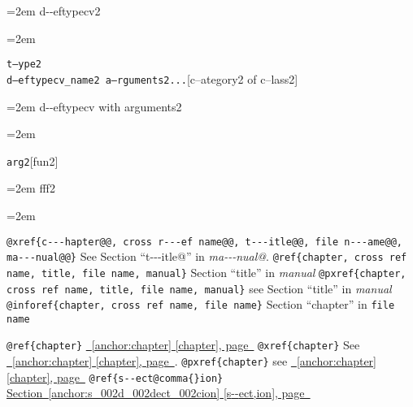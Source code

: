\documentclass{book}
\begin{document}
%
\par\begingroup\obeylines\obeyspaces\frenchspacing\leftskip=2em\relax\parskip=0pt\relax\ttfamily{}%
d{-}{-}eftypecv2
\endgroup{}%
\par\begingroup\obeylines\obeyspaces\frenchspacing\leftskip=2em\relax\parskip=0pt\relax\ttfamily{}%

\endgroup{}%
\noindent\texttt\bgroup{}t--ype2\leavevmode{}\\d--eftypecv\_name2 a--rguments2...\egroup{}\hfill[c--ategory2 of c--lass2]



%
\par\begingroup\obeylines\obeyspaces\frenchspacing\leftskip=2em\relax\parskip=0pt\relax\ttfamily{}%
d{-}{-}eftypecv with arguments2
\endgroup{}%
\par\begingroup\obeylines\obeyspaces\frenchspacing\leftskip=2em\relax\parskip=0pt\relax\ttfamily{}%

\endgroup{}%
\noindent\texttt\bgroup{}arg2\egroup{}\hfill[fun2]



%
\par\begingroup\obeylines\obeyspaces\frenchspacing\leftskip=2em\relax\parskip=0pt\relax\ttfamily{}%
fff2
\endgroup{}%
\par\begingroup\obeylines\obeyspaces\frenchspacing\leftskip=2em\relax\parskip=0pt\relax\ttfamily{}%


\texttt{@xref\{c{-}{-}{-}hapter@@, cross r{-}{-}{-}ef name@@, t{-}{-}{-}itle@@, file n{-}{-}{-}ame@@, ma{-}{-}{-}nual@@\}} See Section ``t{-}{-}{-}itle@'' in \textit{ma{-}{-}{-}nual@}.
\texttt{@ref\{chapter, cross ref name, title, file name, manual\}} Section ``title'' in \textit{manual}
\texttt{@pxref\{chapter, cross ref name, title, file name, manual\}} see Section ``title'' in \textit{manual}
\texttt{@inforef\{chapter, cross ref name, file name\}} Section ``chapter'' in \texttt{file name}

\texttt{@ref\{chapter\}} \hyperref[anchor:chapter]{\chaptername~\ref*{anchor:chapter} [chapter], page~\pageref*{anchor:chapter}}
\texttt{@xref\{chapter\}} See \hyperref[anchor:chapter]{\chaptername~\ref*{anchor:chapter} [chapter], page~\pageref*{anchor:chapter}}.
\texttt{@pxref\{chapter\}} see \hyperref[anchor:chapter]{\chaptername~\ref*{anchor:chapter} [chapter], page~\pageref*{anchor:chapter}}
\texttt{@ref\{s{-}{-}ect@comma\{\}ion\}} \hyperref[anchor:s_002d_002dect_002cion]{Section~\ref*{anchor:s_002d_002dect_002cion} [s{-}{-}ect,ion], page~\pageref*{anchor:s_002d_002dect_002cion}}
\end{document}
